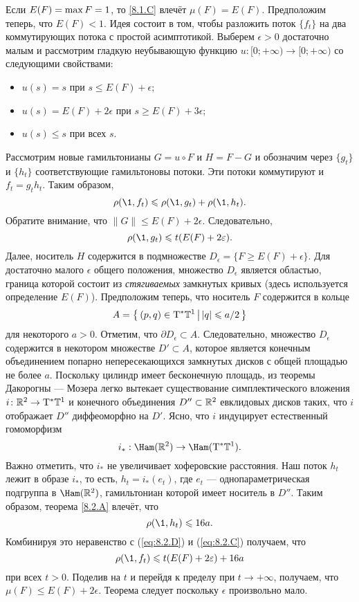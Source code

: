 Если $E (F) \z= \max F = 1$, то \ref{8.1.C} влечёт $\mu (F) = E (F)$.
Предположим теперь, что $E (F) <1$.
Идея состоит в том, чтобы разложить поток $\{f_t\}$ на два
коммутирующих потока с простой асимптотикой. 
Выберем $\epsilon> 0$ достаточно малым и рассмотрим гладкую
неубывающую функцию $u: [0; + \infty) \to [0; + \infty)$ со следующими
    свойствами:  
\begin{itemize}
\item $u (s) = s$ при $s \le E (F) + \epsilon$;
\item $u (s) = E (F) + 2\epsilon$ при $s \ge E (F) + 3\epsilon$;
\item $u (s) \le s$ при всех $s$.
\end{itemize}
Рассмотрим новые гамильтонианы $G = u \circ F$ и $H = F - G$ и
обозначим через $\{g_t\}$ и $\{h_t\}$ соответствующие гамильтоновы
потоки. 
Эти потоки коммутируют и $f_t = g_t h_t$. 
Таким образом, 
\begin{equation}\rho (\1, f_t) \le \rho (\1, g_t) + \rho (\1, h_t).
\label{eq:8.2.C}
\end{equation}
Обратите внимание, что $\| G \| \le E (F) + 2\epsilon$.
Следовательно, 
\begin{equation}
 \rho (\1, g_t) \le t (E (F) + 2\epsilon).
\label{eq:8.2.D}
\end{equation}
Далее, носитель $H$ содержится в подмножестве $D_\epsilon = \{F \ge E
(F) + \epsilon\}$. 
Для достаточно малого $\epsilon$ общего положения, множество
$D_\epsilon$ является областью, граница которой состоит из {}\emph{стягиваемых}
замкнутых кривых (здесь используется определение $E(F)$). 
Предположим теперь, что носитель $F$ содержится в кольце 
\[A = \left\{ \,{(p, q) \in \mathrm{T}^\ast\mathbb{T}^1}\, \middle| \,{| q | \leqslant a / 2}\, \right\}\]
для некоторого $a> 0$. 
Отметим, что $\partial D_\epsilon \subset A$.
Следовательно, множество $D_\epsilon$ содержится в некотором множестве
$D' \subset A$, которое является конечным объединением попарно
непересекающихся замкнутых дисков с общей площадью не более $a$. 
Поскольку цилиндр имеет бесконечную площадь, из теоремы
Дакорогны — Мозера \cite[1.6]{HZ} легко вытекает существование симплектического вложения $i\colon \mathbb{R}^2 \to\mathrm{T}^\ast \mathbb{T}^1$ и конечного объединения $D'' \subset \mathbb{R}^2$ евклидовых дисков таких, что $i$
отображает $D''$ диффеоморфно на $D'$. 
Ясно, что $i$ индуцирует естественный гомоморфизм 
\[i_\ast: \Ham (\RR^2) \to \Ham (\T^\ast \TT^1).\]
Важно отметить, что $i_\ast$ не увеличивает хоферовские расстояния.
Наш поток $h_t$ лежит в образе $i_\ast$, то есть, $h_t = i_\ast (e_{t})$,
где $e_{t}$ — однопараметрическая подгруппа в $\Ham (\RR^2)$,
гамильтониан которой имеет носитель в $D''$. 
Таким образом, теорема \ref{8.2.A} влечёт, что 
\[
\rho (\1, h_t) \le 16a.
\]
Комбинируя это неравенство с (\ref{eq:8.2.D}) и (\ref{eq:8.2.C}) получаем, что
\begin{equation}
  \rho (\1, f_t) \le t (E (F) + 2\epsilon) + 16a 
  \label{eq:8.2.E} 
\end{equation}
при всех $t> 0$.
Поделив на $t$ и перейдя к пределу при $t \to +\infty$, получаем, что
$\mu (F) \le E (F) + 2\epsilon$. 
Теорема следует поскольку $\epsilon$ произвольно мало.
\qeds

